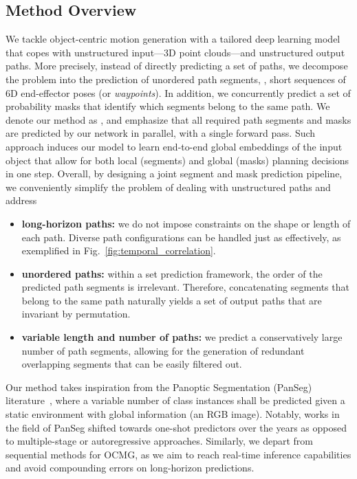 \subsection{Method Overview}
We tackle object-centric motion generation with a tailored deep learning model that copes with unstructured input---3D point clouds---and unstructured output paths.
More precisely, instead of directly predicting a set of paths, we decompose the problem into the prediction of unordered path segments, \ie, short sequences of 6D end-effector poses (or \emph{waypoints}).
%
In addition, we concurrently predict a set of probability masks that identify which segments belong to the same path.
We denote our method as \emph{\ours}, and emphasize that all required path segments and masks are predicted by our network in parallel, with a single forward pass.
Such approach induces our model to learn end-to-end global embeddings of the input object that allow for both local (segments) and global (masks) planning decisions in one step.
Overall, by designing a joint segment and mask prediction pipeline, we conveniently simplify the problem of dealing with unstructured paths and address 

\begin{itemize}[leftmargin=*,itemsep=2pt]
\item \textbf{long-horizon paths:} we do not impose constraints on the shape or length of each path.
Diverse path configurations can be handled just as effectively, as exemplified in Fig.~\ref{fig:temporal_correlation}.
%
\item \textbf{unordered paths:} within a set prediction framework, the order of the predicted path segments is irrelevant. Therefore, concatenating segments that belong to the same path naturally yields a set of output paths that are invariant by permutation.
%
\item \textbf{variable length and number of paths:} we predict a conservatively large number of path segments, allowing for the generation of redundant overlapping segments that can be easily filtered out.
\end{itemize}

Our method takes inspiration from the Panoptic Segmentation (PanSeg) literature~\cite{carion2020detr,cheng2021maskformer}, where a variable number of class instances shall be predicted given a static environment with global information (an RGB image).
Notably, works in the field of PanSeg shifted towards one-shot predictors over the years as opposed to multiple-stage or autoregressive approaches.
Similarly, we depart from sequential methods for OCMG, as we aim to reach real-time inference capabilities and avoid compounding errors on long-horizon predictions.


